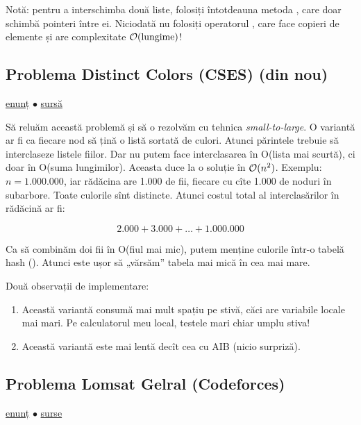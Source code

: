 \documentclass[../main.tex]{subfiles}
\begin{document}
Notă: pentru a interschimba două liste, folosiți întotdeauna metoda , care doar schimbă pointeri între ei. Niciodată nu folosiți operatorul \ccode{=}, care face copieri de elemente și are complexitate $\mathcal{O}(\text{lungime})$!

\subsection{Problema Distinct Colors (CSES) (din nou)}
\label{problem:distinct-colors-small-to-large}

\href{https://cses.fi/problemset/task/1139}{enunț}
$\bullet$
\hyperref[code:distinct-colors-small-to-large]{sursă}

Să reluăm această problemă și să o rezolvăm cu tehnica \textit{small-to-large}. O variantă ar fi ca fiecare nod să țină o listă sortată de culori. Atunci părintele trebuie să interclaseze listele fiilor. Dar nu putem face interclasarea în O(lista mai scurtă), ci doar în O(suma lungimilor). Aceasta duce la o soluție în $\mathcal{O}(n^2)$. Exemplu: $n=1.000.000$, iar rădăcina are 1.000 de fii, fiecare cu cîte 1.000 de noduri în subarbore. Toate culorile sînt distincte. Atunci costul total al interclasărilor în rădăcină ar fi:

$$2.000 + 3.000 + \dots + 1.000.000$$

Ca să combinăm doi fii în O(fiul mai mic), putem menține culorile într-o tabelă hash (). Atunci este ușor să „vărsăm” tabela mai mică în cea mai mare.

Două observații de implementare:

\begin{enumerate}
  \item Această variantă consumă mai mult spațiu pe stivă, căci are variabile locale mai mari. Pe calculatorul meu local, testele mari chiar umplu stiva!

  \item Această variantă este mai lentă decît cea cu AIB (nicio surpriză).
\end{enumerate}

\subsection{Problema Lomsat Gelral (Codeforces)}
\label{problem:lomsat-gelral}

\href{https://codeforces.com/contest/600/problem/E}{enunț}
$\bullet$
\hyperref[code:lomsat-gelral]{surse}
\end{document}
